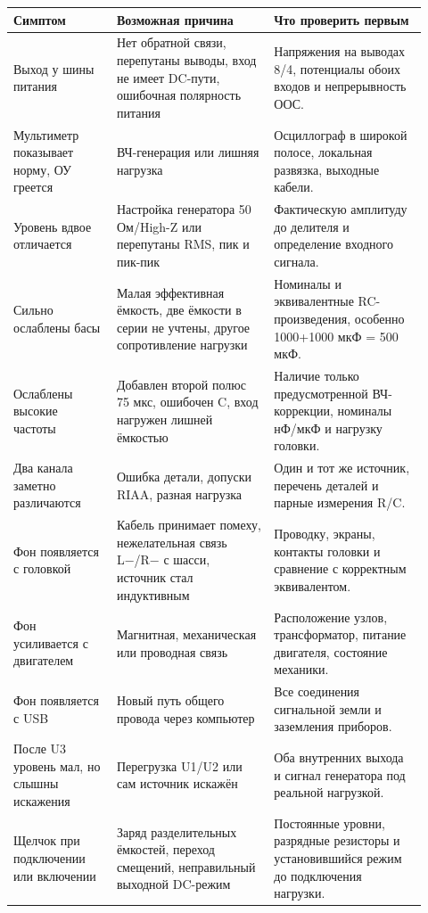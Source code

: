\documentclass[a4paper,11pt]{article}
\begin{document}
\begin{longtable}{@{}L{0.23\linewidth}L{0.35\linewidth}L{0.34\linewidth}@{}}
\toprule
Симптом & Возможная причина & Что проверить первым\\
\midrule\endhead
Выход у шины питания & Нет обратной связи, перепутаны выводы, вход
не имеет DC-пути, ошибочная полярность питания & Напряжения на выводах 8/4,
потенциалы обоих входов и непрерывность ООС.\\
Мультиметр показывает норму, ОУ греется & ВЧ-генерация или лишняя нагрузка &
Осциллограф в широкой полосе, локальная развязка, выходные кабели.\\
Уровень вдвое отличается & Настройка генератора 50 Ом/High-Z или перепутаны
RMS, пик и пик-пик & Фактическую амплитуду до делителя и определение входного сигнала.\\
Сильно ослаблены басы & Малая эффективная ёмкость, две ёмкости в серии
не учтены, другое сопротивление нагрузки & Номиналы и эквивалентные RC-произведения,
особенно 1000+1000 мкФ = 500 мкФ.\\
Ослаблены высокие частоты & Добавлен второй полюс 75 мкс, ошибочен C,
вход нагружен лишней ёмкостью & Наличие только предусмотренной ВЧ-коррекции,
номиналы нФ/мкФ и нагрузку головки.\\
Два канала заметно различаются & Ошибка детали, допуски RIAA, разная нагрузка &
Один и тот же источник, перечень деталей и парные измерения R/C.\\
Фон появляется с головкой & Кабель принимает помеху, нежелательная связь
L−/R− с шасси, источник стал индуктивным & Проводку, экраны, контакты головки
и сравнение с корректным эквивалентом.\\
Фон усиливается с двигателем & Магнитная, механическая или проводная связь &
Расположение узлов, трансформатор, питание двигателя, состояние механики.\\
Фон появляется с USB & Новый путь общего провода через компьютер &
Все соединения сигнальной земли и заземления приборов.\\
После U3 уровень мал, но слышны искажения & Перегрузка U1/U2 или сам источник
искажён & Оба внутренних выхода и сигнал генератора под реальной нагрузкой.\\
Щелчок при подключении или включении & Заряд разделительных ёмкостей,
переход смещений, неправильный выходной DC-режим & Постоянные уровни,
разрядные резисторы и установившийся режим до подключения нагрузки.\\
\bottomrule
\end{longtable}
\end{document}
